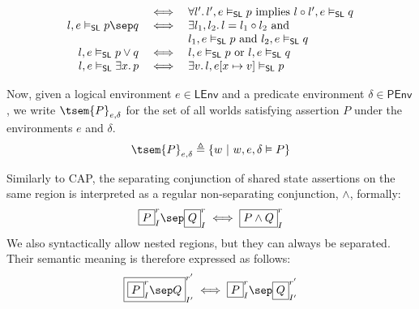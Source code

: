\begin{defn}
\[\begin{array}{r c l}
		&
		\iff
		&
		\forall l' \ldotp l', e \vDash_\mathsf{SL} p \text{ implies } l \circ l', e \vDash_\mathsf{SL} q
	\\
		l, e \vDash_\mathsf{SL} p \sep q
		&
		\iff
		&
		\exists l_1, l_2 \ldotp l = l_1 \circ l_2 \text{ and } \\
		&& l_1, e \vDash_\mathsf{SL} p \text{ and } l_2, e \vDash_\mathsf{SL} q
	\\
		 l, e \vDash_\mathsf{SL} p \lor q
		 &
		 \iff
		 &
		 l, e \vDash_\mathsf{SL} p \text{ or } l, e \vDash_\mathsf{SL} q
	\\
		l, e \vDash_\mathsf{SL} \exists x \ldotp p
		&
		\iff
		&
		\exists v \ldotp l, e[x \mapsto v] \vDash_\mathsf{SL} p
	\end{array}
	\]
	\endgroup
\end{defn}
Now, given a logical environment $e \in \mathsf{LEnv}$ and a predicate environment $\delta \in \mathsf{PEnv}$, we write $\tsem{P}_{e, \delta}$ for the set of all worlds satisfying assertion $P$ under the environments $e$ and $\delta$.
\[
	\tsem{P}_{e, \delta} \triangleq \{ w\ |\ w, e, \delta \vDash P \}
\]

Similarly to CAP, the separating conjunction of shared state assertions on the same region is interpreted as a regular non-separating conjunction, $\land$, formally:
\[
	\boxed{P}^r_I \sep \boxed{Q}^r_I \iff \boxed{P \land Q}^r_I
\]
We also syntactically allow nested regions, but they can always be separated. Their semantic meaning is therefore expressed as follows:
\[
	\boxed{\boxed{P}^r_I \sep Q}^{r'}_{I'} \iff \boxed{P}^r_I \sep \boxed{Q}^{r'}_{I'}
\]